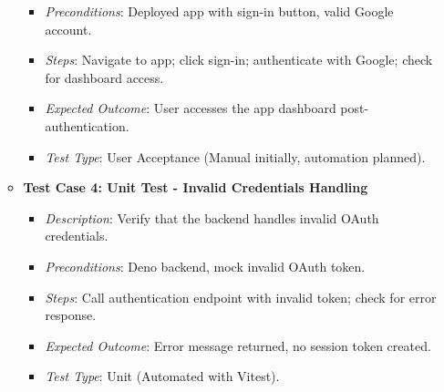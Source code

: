 \documentclass[12pt]{article}
\begin{document}
\begin{itemize}
\begin{itemize}
\begin{itemize}
          \item \textit{Preconditions}: Deployed app with sign-in button, valid Google account.
          \item \textit{Steps}: Navigate to app; click sign-in; authenticate with Google; check for dashboard access.
          \item \textit{Expected Outcome}: User accesses the app dashboard post-authentication.
          \item \textit{Test Type}: User Acceptance (Manual initially, automation planned).
        \end{itemize}
      \item \textbf{Test Case 4: Unit Test - Invalid Credentials Handling}
        \begin{itemize}
          \item \textit{Description}: Verify that the backend handles invalid OAuth credentials.
          \item \textit{Preconditions}: Deno backend, mock invalid OAuth token.
          \item \textit{Steps}: Call authentication endpoint with invalid token; check for error response.
          \item \textit{Expected Outcome}: Error message returned, no session token created.
          \item \textit{Test Type}: Unit (Automated with Vitest).
        \end{itemize}
    \end{itemize}


\end{itemize}
\end{document}
